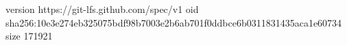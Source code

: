 version https://git-lfs.github.com/spec/v1
oid sha256:10e3e274eb325075bdf98b7003e2b6ab701f0ddbce6b0311831435aca1e60734
size 171921

